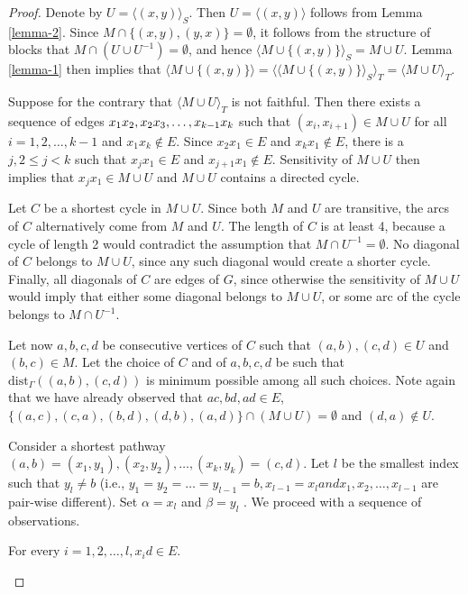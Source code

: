 \begin{proof}
	Denote by $U = \langle(x, y)\rangle_S$. Then $U = \langle(x, y)\rangle$ follows from Lemma \ref{lemma-2}. Since $M \cap \{(x, y), (y, x)\} = \emptyset$, it follows from the structure of blocks that $M \cap (U \cup U^{-1}) = \emptyset$, and hence $\langle M \cup \{(x, y)\}\rangle_S = M \cup U$. Lemma \ref{lemma-1} then implies that $\langle M \cup \{(x, y)\}\rangle = \langle\langle M \cup \{(x, y)\}\rangle_S \rangle_T = \langle M \cup U \rangle_T$.
	
	Suppose for the contrary that $\langle M \cup U \rangle_T$ is not faithful. Then there exists a sequence of edges $x_1 x_2 , x_2 x_3 , \dots,\\ x_{k-1} x_k$ such that $(x_i , x_{i+1}) \in M \cup U$ for all $i = 1, 2, \dots, k - 1$ and $x_1 x_k \notin E$. Since $x_2 x_1 \in E$ and $x_k x_1 \notin E$, there is a $j, 2 \leq j < k$ such that $x_j x_1 \in E$ and $x_{j+1} x_1 \notin E$. Sensitivity of $M \cup U$ then implies that $x_j x_1 \in M \cup U$ and $M \cup U$ contains a directed cycle.
	
	Let $C$ be a shortest cycle in $M \cup U$. Since both $M$ and $U$ are transitive, the arcs of $C$ alternatively come from $M$ and $U$. The length of $C$ is at least 4, because a cycle of length 2 would contradict the assumption that $M \cap U^{-1} = \emptyset$. No diagonal of $C$ belongs to $M \cup U$, since any such diagonal would create a shorter cycle. Finally, all diagonals of $C$ are edges of $G$, since otherwise the sensitivity of $M \cup U$ would imply that either some diagonal belongs to $M \cup U$, or some arc of the cycle belongs to $M \cap U^{-1}$.
	
	Let now $a, b, c, d$ be consecutive vertices of $C$ such that $(a, b), (c, d) \in U$ and $(b, c) \in M$. Let the choice of $C$ and of $a, b, c, d$ be such that $\text{dist}_\Gamma ((a, b), (c, d))$ is minimum possible among all such choices. Note again that we have already observed that $ac, bd, ad \in E$, $\{(a, c), (c, a), (b, d), (d, b), (a, d)\} \cap (M \cup U) = \emptyset$ and $(d, a) \notin U$.
	
	Consider a shortest pathway $(a, b) = (x_1 , y_1), (x_2 , y_2), \dots , (x_k , y_k) = (c, d)$. Let $l$ be the smallest
	index such that $y_l \neq b$ (i.e., $y_1 = y_2 = \dots = y_{l-1} = b, x_{l-1} = x_l and x_1 , x_2 , \dots , x_{l-1}$ are pair-wise
	different). Set $\alpha = x_l$ and $\beta = y_l$ . We proceed with a sequence of observations.

	\begin{claim}
		For every $i = 1, 2, \dots , l, x_i d \in E$.
	\end{claim}
	

\end{proof}

